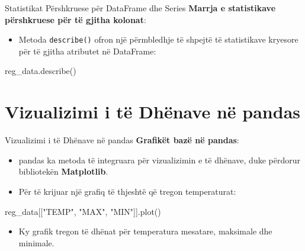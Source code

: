 \documentclass[
  ignorenonframetext,
]{beamer}
\newenvironment{Shaded}{\begin{snugshade}}{\end{snugshade}}
\newcommand{\NormalTok}[1]{#1}
\newcommand{\StringTok}[1]{\textcolor[rgb]{0.31,0.60,0.02}{#1}}
\providecommand{\tightlist}{%
  \setlength{\itemsep}{0pt}\setlength{\parskip}{0pt}}
\begin{document}
\begin{frame}[fragile]{Statistikat Përshkruese për DataFrame dhe Series}
\protect\hypertarget{statistikat-puxebrshkruese-puxebr-dataframe-dhe-series-3}{}
\textbf{Marrja e statistikave përshkruese për të gjitha kolonat}:

\begin{itemize}
\tightlist
\item
  Metoda \texttt{describe()} ofron një përmbledhje të shpejtë të
  statistikave kryesore për të gjitha atributet në DataFrame:
\end{itemize}

\begin{Shaded}
\begin{Highlighting}[]
\NormalTok{    reg\_data.describe()}
\end{Highlighting}
\end{Shaded}
\end{frame}

\hypertarget{vizualizimi-i-tuxeb-dhuxebnave-nuxeb-pandas}{%
\section{Vizualizimi i të Dhënave në
pandas}\label{vizualizimi-i-tuxeb-dhuxebnave-nuxeb-pandas}}

\begin{frame}[fragile]{Vizualizimi i të Dhënave në pandas}
\protect\hypertarget{vizualizimi-i-tuxeb-dhuxebnave-nuxeb-pandas-1}{}
\textbf{Grafikët bazë në pandas}:

\begin{itemize}
\item
  pandas ka metoda të integruara për vizualizimin e të dhënave, duke
  përdorur bibliotekën \textbf{Matplotlib}.
\item
  Për të krijuar një grafiq të thjeshtë që tregon temperaturat:
\end{itemize}

\begin{Shaded}
\begin{Highlighting}[]
\NormalTok{    reg\_data[[}\StringTok{"TEMP"}\NormalTok{, }\StringTok{"MAX"}\NormalTok{, }\StringTok{"MIN"}\NormalTok{]].plot()}
\end{Highlighting}
\end{Shaded}

\begin{itemize}
\tightlist
\item
  Ky grafik tregon të dhënat për temperatura mesatare, maksimale dhe
  minimale.
\end{itemize}
\end{frame}
\end{document}
